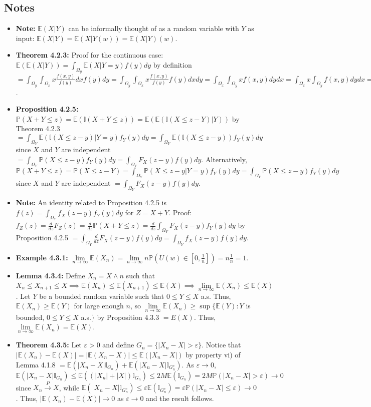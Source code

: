 \documentclass[12pt]{article}
\newcommand{\E}{\mathbb{E}}
\newcommand{\I}{\mathbb{I}}
\newcommand{\p}{\mathbb{P}}
\begin{document}
\subsection*{Notes}
\begin{itemize}
    \item \textbf{Note:} $\E(X|Y)$ can be informally thought of as a random variable with $Y$ as input: $\E(X|Y) = \E(X|Y(w)) = \E(X|Y)(w)$.
    \item \textbf{Theorem 4.2.3:} Proof for the continuous case: $\E(\E(X|Y)) = \int_{\Omega_y} \E(X|Y = y)f(y)dy$ by definition $= \int_{\Omega_y} \int_{\Omega_x} x\frac{f(x, y)}{f(y)}dx f(y)dy = \int_{\Omega_y} \int_{\Omega_x} x\frac{f(x, y)}{f(y)}f(y)dxdy = \int_{\Omega_x} \int_{\Omega_y} xf(x, y)dydx = \int_{\Omega_x} x \int_{\Omega_y} f(x, y)dydx = \int_{\Omega_x} xf(x)dx = \E(X)$.
    \item \textbf{Proposition 4.2.5:} $\p(X + Y \leq z) = \E(\I(X + Y \leq z)) = \E(\E(\I(X \leq z - Y)|Y))$ by Theorem 4.2.3 $= \int_{\Omega_Y} \E(\I(X \leq z - y)|Y = y)f_Y(y)dy = \int_{\Omega_Y} \E(\I(X \leq z - y))f_Y(y)dy$ since $X$ and $Y$ are independent $= \int_{\Omega_Y} \p(X \leq z - y)f_Y(y)dy = \int_{\Omega_Y} F_X(z - y)f(y)dy$. Alternatively, $\p(X + Y \leq z) = \p(X \leq z - Y) = \int_{\Omega_Y} \p(X \leq z - y|Y = y)f_Y(y)dy = \int_{\Omega_Y} \p(X \leq z - y)f_Y(y)dy$ since $X$ and $Y$ are independent $= \int_{\Omega_Y} F_X(z - y)f(y)dy$.
    \item \textbf{Note:} An identity related to Proposition 4.2.5 is $f(z) = \int_{\Omega_Y} f_X(z - y)f_Y(y)dy$ for $Z = X + Y$. Proof: $f_Z(z) = \frac{d}{dz} F_Z(z) = \frac{d}{dz} \p(X + Y \leq z) = \frac{d}{dz} \int_{\Omega_Y} F_X(z - y)f_Y(y)dy$ by Proposition 4.2.5 $= \int_{\Omega_Y} \frac{d}{dz} F_X(z - y)f(y)dy = \int_{\Omega_Y} f_X(z - y)f(y)dy$.
    \item \textbf{Example 4.3.1:} $\lim \limits_{n \to \infty} \E(X_n) = \lim \limits_{n \to \infty} n\p(U(w) \in [0,\frac{1}{n}]) = n\frac{1}{n} = 1$.
    \item \textbf{Lemma 4.3.4:} Define $X_n = X \wedge n$ such that $X_n \leq X_{n+1} \leq X \implies \E(X_n) \leq \E(X_{n+1}) \leq \E(X) \implies \lim \limits_{n \to \infty} \E(X_n) \leq \E(X)$. Let $Y$ be a bounded random variable such that $0 \leq Y \leq X$ a.s. Thus, $\E(X_n) \geq \E(Y)$ for large enough $n$, so $\lim \limits_{n \to \infty} \E(X_n) \geq \sup\{\E(Y): Y$ is bounded, $0 \leq Y \leq X$ a.s.$\}$ by Proposition 4.3.3 $= E(X)$. Thus, $\lim \limits_{n \to \infty} \E(X_n) = \E(X)$.
    \item \textbf{Theorem 4.3.5:} Let $\varepsilon > 0$ and define $G_n = \{|X_n - X| > \varepsilon\}$. Notice that $|\E(X_n) - \E(X)| = |\E(X_n - X)| \leq \E(|X_n - X|)$ by property vi) of Lemma 4.1.8 $= \E(|X_n - X| \I_{G_n}) + \E(|X_n - X| \I_{G_n^c})$. As $\varepsilon \to 0$, $\E(|X_n - X| \I_{G_n}) \leq \E((|X_n| + |X|) \I_{G_n}) \leq 2M\E(\I_{G_n}) = 2M\p(|X_n - X| > \varepsilon) \to 0$ since $X_n \overset{P}{\to} X$, while $\E(|X_n - X| \I_{G_n^c}) \leq \varepsilon\E(\I_{G_n^c}) = \varepsilon\p(|X_n - X| \leq \varepsilon) \to 0$. Thus, $|\E(X_n) - \E(X)| \to 0$ as $\varepsilon \to 0$ and the result follows.

\end{itemize}
\end{document}
